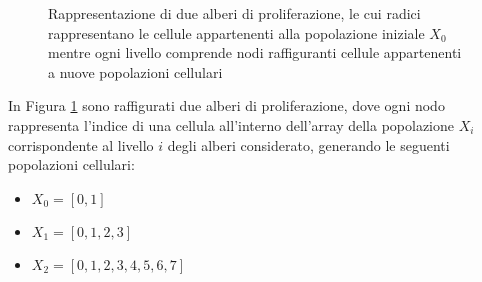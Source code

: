 \begin{figure}[t]
    \begin{minipage}[b]{.5\linewidth}
    \centering
    \end{minipage}
    \begin{minipage}[b]{.5\linewidth}
    \centering
    \end{minipage}
    \caption{Rappresentazione di due alberi di proliferazione, le cui radici
        rappresentano le cellule appartenenti alla popolazione iniziale $X_{0}$
        mentre ogni livello comprende nodi raffiguranti cellule appartenenti
        a nuove popolazioni cellulari}
    \label{fig:prolif-tree}
\end{figure}
In Figura \ref{fig:prolif-tree} sono raffigurati due alberi di proliferazione,
dove ogni nodo
rappresenta l'indice di una cellula all'interno dell'array della popolazione
$X_{i}$ corrispondente al livello $i$ degli alberi considerato, generando 
le seguenti popolazioni cellulari:

\begin{itemize}
    \item $X_{0} = [0, 1]$
    \item $X_{1} = [0, 1, 2, 3]$
    \item $X_{2} = [0, 1, 2, 3, 4, 5, 6, 7]$    
\end{itemize}

